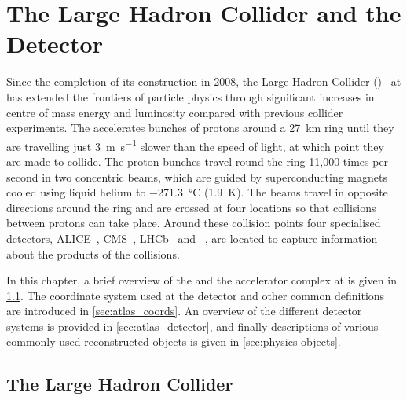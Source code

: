 \chapter{The Large Hadron Collider and the \ATLAS Detector}\label{chap:lhc_atlas}


Since the completion of its construction in 2008, the Large Hadron Collider (\LHC)~\cite{Evans:2008zzb} at \CERN has extended the frontiers of particle physics through significant increases in centre of mass energy and luminosity compared with previous collider experiments.
The \LHC accelerates bunches of protons around a \SI{27}{\km} ring until they are travelling just \SI{3}{\m\per\s} slower than the speed of light, at which point they are made to collide.
The proton bunches travel round the ring 11,000 times per second in two concentric beams, which are guided by superconducting magnets cooled using liquid helium to \SI{-271.3}{\degreeCelsius} (\SI{1.9}{\kelvin}).
The beams travel in opposite directions around the ring and are crossed at four locations so that collisions between protons can take place.
Around these collision points four specialised detectors, ALICE~\cite{AliceCollaboration_2008}, CMS~\cite{CMS-TDR-08-001}, LHCb~\cite{LHCbCollaboration_2008} and \ATLAS~\cite{PERF-2007-01}, are located to capture information about the products of the collisions.

In this chapter, a brief overview of the \LHC and the accelerator complex at \CERN is given in \cref{sec:lhc}.
The coordinate system used at the \ATLAS detector and other common definitions are introduced in \cref{sec:atlas_coords}.
An overview of the different detector systems is provided in \cref{sec:atlas_detector}, and finally descriptions of various commonly used reconstructed objects is given in \cref{sec:physics-objects}.


\section{The Large Hadron Collider}\label{sec:lhc}

